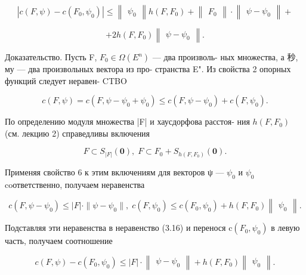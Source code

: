 \documentclass[8pt]{extarticle}
\begin{document}
\[
\left| {c\left( {F,\psi }\right)  - c\left( {{F}_{0},{\psi }_{0}}\right) }\right|  \leq  \left\lVert \begin{array}{c} {\psi }_{0} \end{array} \right\rVert h\left( {F,{F}_{0}}\right)  + \left\lVert \begin{array}{c} {F}_{0} \end{array} \right\rVert \cdot  \left\lVert \begin{array}{c} {\psi  - {\psi }_{0}} \end{array} \right\rVert +
\]

\[
+ {2h}\left( {F,{F}_{0}}\right) \left\lVert \begin{array}{c} {\psi  - {\psi }_{0}} \end{array} \right\rVert. \tag{3.18}
\]

Доказательство. Пусть F, \({F}_{0} \in  \Omega \left( {E}^{n}\right)\) — два произволь- ных множества, а 秒, му — два произвольных вектора из про- странства E". Из свойства 2 опорных функций следует неравен- CTBO

\[
c\left( {F,\psi }\right)  = c\left( {F,\psi  - {\psi }_{0} + {\psi }_{0}}\right)  \leq  c\left( {F,\psi  - {\psi }_{0}}\right)  + c\left( {F,{\psi }_{0}}\right) . \tag{3.16}
\]

По определению модуля множества |F| и хаусдорфова расстоя- ния \(h\left( {F,{F}_{0}}\right)\) (см. лекцию 2) справедливы включения

\[
F \subset  {S}_{\left| F\right| }\left( \mathbf{0}\right) ,\;F \subset  {F}_{0} + {S}_{h\left( {F,{F}_{0}}\right) }\left( \mathbf{0}\right) .
\]

Применяя свойство 6 к этим включениям для векторов ψ — \({\psi }_{0}\) и \({\psi }_{0}\) coответственно, получаем неравенства

\[
c\left( {F,\psi  - {\psi }_{0}}\right)  \leq  \left| F\right|  \cdot  \parallel \psi  - {\psi }_{0}\parallel ,\;c\left( {F,{\psi }_{0}}\right)  \leq  c\left( {{F}_{0},{\psi }_{0}}\right)  + h\left( {F,{F}_{0}}\right) \left\lVert \begin{array}{c} {\psi }_{0} \end{array} \right\rVert.
\]

Подставляя эти неравенства в неравенство (3.16) и перенося \(\mathrm{c}\left( {{F}_{0},{\psi }_{0}}\right)\) в левую часть, получаем соотношение

\[
c\left( {F,\psi }\right)  - c\left( {{F}_{0},{\psi }_{0}}\right)  \leq  \left| F\right|  \cdot  \left\lVert \begin{array}{c} {\psi  - {\psi }_{0}} \end{array} \right\rVert + h\left( {F,{F}_{0}}\right) \left\lVert \begin{array}{c} {\psi }_{0} \end{array} \right\rVert.
\]
\end{document}
